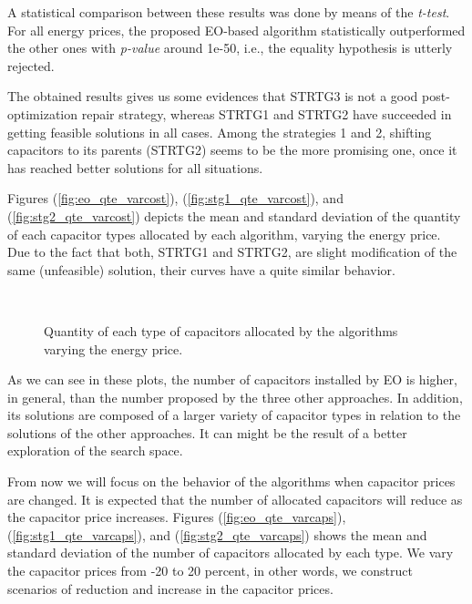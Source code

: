 \documentclass[11pt]{article}
\begin{document}
A statistical comparison between these results was done by means of the {\it t-test}.
For all energy prices, the proposed EO-based algorithm statistically outperformed
the other ones with {\it p-value} around 1e-50, i.e., the equality hypothesis is
utterly rejected.

The obtained results gives us some evidences that STRTG3 is not a good post-optimization
repair strategy, whereas STRTG1 and STRTG2 have succeeded in getting feasible solutions
in all cases. Among the strategies 1 and 2, shifting capacitors to its parents (STRTG2)
seems to be the more promising one, once it has reached better solutions for all situations.

Figures (\ref{fig:eo_qte_varcost}), (\ref{fig:stg1_qte_varcost}), and (\ref{fig:stg2_qte_varcost})
depicts the mean and standard deviation of the quantity of each capacitor types allocated by
each algorithm, varying the energy price. Due to the fact that both, STRTG1 and STRTG2, are 
slight modification of the same (unfeasible) solution, their curves have a quite similar behavior.

\begin{figure*}[htb]
  \centering
  ~ 

  \caption{Quantity of each type of capacitors allocated by the algorithms varying the energy price.}
  \label{fig:type_caps_allocated}
\end{figure*}

As we can see in these plots, the number of capacitors installed by EO is higher, in general, than the number proposed by 
the three other approaches. In addition, its solutions are composed of a larger variety of capacitor types in relation 
to the solutions of the other approaches. It can might be the result of a better exploration of the search space.

From now we will focus on the behavior of the algorithms when capacitor prices are changed. It is expected that the number of 
allocated capacitors will reduce as the capacitor price increases. Figures (\ref{fig:eo_qte_varcaps}), 
(\ref{fig:stg1_qte_varcaps}), and (\ref{fig:stg2_qte_varcaps}) shows the mean and standard deviation of 
the number of capacitors allocated by each type. We vary the capacitor prices from -20 to 20 percent, in other words, 
we construct scenarios of reduction and increase in the capacitor prices.
\end{document}
